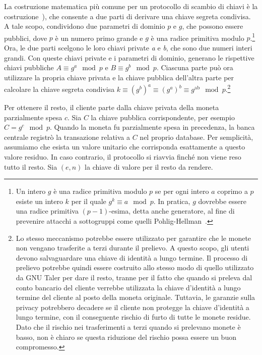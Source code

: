 \documentclass{article}
\begin{document}
La costruzione matematica più comune per un protocollo di scambio di 
chiavi è la costruzione~\cite{Diffie}), che 
consente a due parti di derivare una chiave segreta condivisa. A tale 
scopo, condividono due parametri di dominio $p$ e $g$, che possono 
essere pubblici, dove $p$ è un numero primo grande e $g$ è una radice 
primitiva modulo $p$.\footnote{Un intero $g$ è una radice primitiva 
modulo $p$ se per ogni intero $a$ coprimo a $p$ esiste un intero $k$ 
per il quale 
$g^k \equiv a \mod p$. 
In pratica, $g$ dovrebbe essere una radice primitiva $(p-1)$-esima, detta 
anche generatore, al fine di prevenire attacchi a sottogruppi come quelli 
Pohlig-Hellman~\cite[vedi][]{Lim}.} Ora, le due parti scelgono le loro 
chiavi private \emph{a} e \emph{b}, che sono due numeri interi grandi. 
Con queste chiavi private e i parametri di dominio, generano le 
rispettive chiavi pubbliche 
$A \equiv g^{a} \mod p$ e $B \equiv g^{b} \mod p$. 
Ciascuna parte può ora utilizzare la propria chiave privata e la chiave 
pubblica dell'altra parte per calcolare la chiave segreta condivisa 
$k \equiv \left( g^b \right)^{a} \equiv \left( g^{a} \right)^{b} \equiv g^{\text{ab}} \mod p$.\footnote{
Lo stesso meccanismo potrebbe essere utilizzato per garantire 
che le monete non vengano trasferite a terzi durante il prelievo. A 
questo scopo, gli utenti devono salvaguardare una chiave di identità a 
lungo termine. Il processo di prelievo potrebbe quindi essere 
costruito allo stesso modo di quello utilizzato da GNU Taler per dare 
il resto, tranne per il fatto che quando si preleva dal conto bancario 
del cliente verrebbe utilizzata la chiave d'identità a lungo termine 
del cliente al posto della moneta originale. Tuttavia, le garanzie 
sulla privacy potrebbero decadere se il cliente non protegge la chiave 
d'identità a lungo termine, con il conseguente rischio di furto di 
tutte le monete residue. Dato che il rischio nei trasferimenti a terzi 
quando si prelevano monete è basso, non è chiaro se questa riduzione 
del rischio possa essere un buon compromesso.}

Per ottenere il resto, il cliente parte dalla chiave privata della 
moneta parzialmente spesa $c$. Sia $C$ la chiave pubblica corrispondente, 
per esempio  
$C = g^{c} \mod p$. 
Quando la moneta fu parzialmente spesa in precedenza, la banca centrale 
registrò la transazione relativa a $C$ nel proprio database. Per 
semplicità, assumiamo che esista un valore unitario che corrisponda 
esattamente a questo valore residuo. In caso contrario, il protocollo si 
riavvia finché non viene reso tutto il resto. Sia $(e,n)$ la 
chiave di valore per il resto da rendere.
\end{document}
